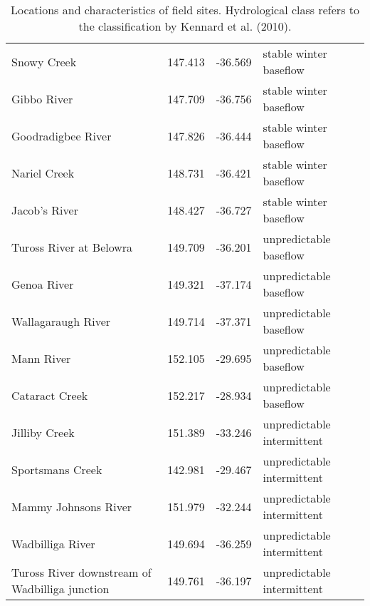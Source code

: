\documentclass[openright,12pt,a4paper]{memoir}
\begin{document}
\onehalfspacing

\begin{table}[ht]
\tiny
\centering
\caption[Locations and characteristics of field sites.]{\small{Locations and characteristics of field sites. Hydrological class refers to the classification by Kennard et al. (2010).}}
\label{tab:Ch2sup_T1}
{\tabulinesep=1.2mm
\begin{tabu}to 
\hline
{} &  &  &  \\
\hline
Snowy Creek & 147.413 & -36.569 & stable winter baseflow \\
Gibbo River & 147.709 & -36.756 & stable winter baseflow \\
Goodradigbee River & 147.826 & -36.444 & stable winter baseflow \\
Nariel Creek & 148.731 & -36.421 & stable winter baseflow \\
Jacob’s River & 148.427 & -36.727 & stable winter baseflow \\
Tuross River at Belowra & 149.709 & -36.201 & unpredictable baseflow \\
Genoa River & 149.321 & -37.174 & unpredictable baseflow \\
Wallagaraugh River & 149.714 & -37.371 & unpredictable baseflow \\
Mann River & 152.105 & -29.695 & unpredictable baseflow \\
Cataract Creek & 152.217 & -28.934 & unpredictable baseflow \\
Jilliby Creek & 151.389 & -33.246 & unpredictable intermittent \\
Sportsmans Creek & 142.981 & -29.467 & unpredictable intermittent \\
Mammy Johnsons River & 151.979 & -32.244 & unpredictable intermittent \\
Wadbilliga River & 149.694 & -36.259 & unpredictable intermittent \\
Tuross River downstream of Wadbilliga junction & 149.761 & -36.197 & unpredictable intermittent \\ \hline
\end{tabu}}
\end{table}
\clearpage
\end{document}
